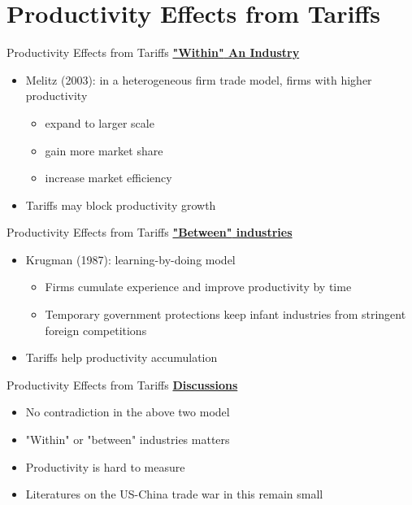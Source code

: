 \documentclass{beamer}
\begin{document}
\section{Productivity Effects from Tariffs}
\begin{frame}{Productivity Effects from Tariffs}
\underline{\textbf{{\color{red}"Within"} An Industry}}
\begin{itemize}
    \item Melitz (2003): in a heterogeneous firm trade model, firms with {\color{red}higher productivity}
    \begin{itemize}
        \item expand to larger scale
        \item gain more market share
        \item increase market efficiency
    \end{itemize}
    \item Tariffs may {\color{red}block} productivity growth
\end{itemize}
\end{frame}

\begin{frame}{Productivity Effects from Tariffs}
\underline{\textbf{{\color{red}"Between"} industries}}
\begin{itemize}
    \item Krugman (1987): {\color{red}learning-by-doing} model
    \begin{itemize}
        \item Firms {\color{red}cumulate} experience and {\color{red}improve productivity} by time
        \item Temporary government protections keep infant industries from stringent foreign competitions
    \end{itemize}
    \item Tariffs {\color{red}help} productivity accumulation
\end{itemize}
\end{frame}

\begin{frame}{Productivity Effects from Tariffs}
    \underline{\textbf{{Discussions}}}
    \begin{itemize}
        \item No contradiction in the above two model
        \item {\color{red}"Within"} or {\color{red}"between"} industries matters
        \item Productivity is hard to measure
        \item Literatures on the US-China trade war in this remain small
    \end{itemize}
\end{frame}
\end{document}
